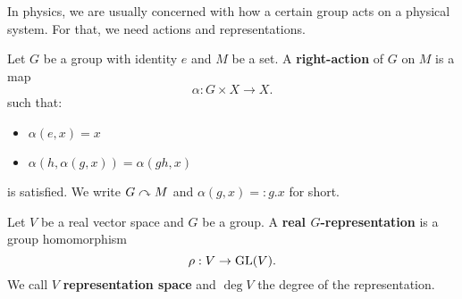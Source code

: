 In physics, we are usually concerned with how a certain group acts on a physical system. For that, we need actions and representations.
\begin{definition}
    Let $G$ be a group with identity $e$ and $M$ be a set. A \textbf{right-action} of $G$ on $M$ is a map \[
    \alpha: G \times X \to X
    .\] 
    such that:
    \begin{itemize}
        \item $\alpha(e,x) = x$
        \item $\alpha(h, \alpha(g,x))=\alpha(gh,x)$
    \end{itemize}
    is satisfied. We write $G \curvearrowright M$ and $\alpha(g,x)=:g.x$ for short.
\end{definition}
\begin{definition}[Representation]
    Let $V$ be a real vector space and $G$ be a group. A \textbf{real $G$-representation} is a group homomorphism \[
    \rho: V \to \operatorname{GL}(V)
    .\] 
    We call $V$ \textbf{representation space} and $\deg V$ the degree of the representation.
    
\end{definition}
